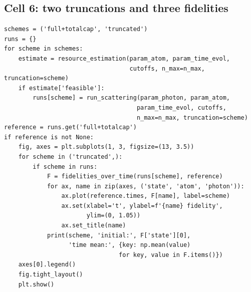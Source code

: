 \documentclass[11pt,a4paper]{article}
\begin{document}
\subsection{Cell 6: two truncations and three fidelities}
\begin{lstlisting}
schemes = ('full+totalcap', 'truncated')
runs = {}
for scheme in schemes:
    estimate = resource_estimation(param_atom, param_time_evol,
                                   cutoffs, n_max=n_max, truncation=scheme)
    if estimate['feasible']:
        runs[scheme] = run_scattering(param_photon, param_atom,
                                     param_time_evol, cutoffs,
                                     n_max=n_max, truncation=scheme)
reference = runs.get('full+totalcap')
if reference is not None:
    fig, axes = plt.subplots(1, 3, figsize=(13, 3.5))
    for scheme in ('truncated',):
        if scheme in runs:
            F = fidelities_over_time(runs[scheme], reference)
            for ax, name in zip(axes, ('state', 'atom', 'photon')):
                ax.plot(reference.times, F[name], label=scheme)
                ax.set(xlabel='t', ylabel=f'{name} fidelity',
                       ylim=(0, 1.05))
                ax.set_title(name)
            print(scheme, 'initial:', F['state'][0],
                  'time mean:', {key: np.mean(value)
                                for key, value in F.items()})
    axes[0].legend()
    fig.tight_layout()
    plt.show()
\end{lstlisting}
\end{document}
